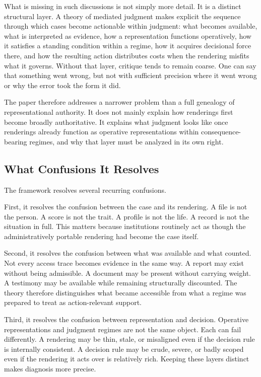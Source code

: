 \documentclass[11pt]{article}
\begin{document}
What is missing in such discussions is not simply more detail. It is a distinct structural layer. A theory of mediated judgment makes explicit the sequence through which cases become actionable within judgment: what becomes available, what is interpreted as evidence, how a representation functions operatively, how it satisfies a standing condition within a regime, how it acquires decisional force there, and how the resulting action distributes costs when the rendering misfits what it governs. Without that layer, critique tends to remain coarse. One can say that something went wrong, but not with sufficient precision where it went wrong or why the error took the form it did.

The paper therefore addresses a narrower problem than a full genealogy of representational authority. It does not mainly explain how renderings first become broadly authoritative. It explains what judgment looks like once renderings already function as operative representations within consequence-bearing regimes, and why that layer must be analyzed in its own right.

\subsection{What Confusions It Resolves}

The framework resolves several recurring confusions.

First, it resolves the confusion between the case and its rendering. A file is not the person. A score is not the trait. A profile is not the life. A record is not the situation in full. This matters because institutions routinely act as though the administratively portable rendering had become the case itself.

Second, it resolves the confusion between what was available and what counted. Not every access trace becomes evidence in the same way. A report may exist without being admissible. A document may be present without carrying weight. A testimony may be available while remaining structurally discounted. The theory therefore distinguishes what became accessible from what a regime was prepared to treat as action-relevant support.

Third, it resolves the confusion between representation and decision. Operative representations and judgment regimes are not the same object. Each can fail differently. A rendering may be thin, stale, or misaligned even if the decision rule is internally consistent. A decision rule may be crude, severe, or badly scoped even if the rendering it acts over is relatively rich. Keeping these layers distinct makes diagnosis more precise.
\end{document}
